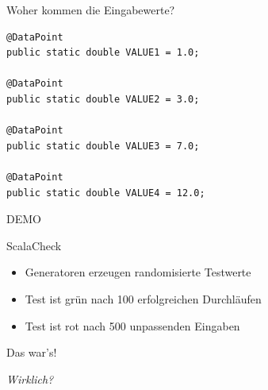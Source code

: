 \begin{frame}[fragile]{Woher kommen die Eingabewerte?}
\begin{lstlisting}
@DataPoint
public static double VALUE1 = 1.0;

@DataPoint
public static double VALUE2 = 3.0;

@DataPoint
public static double VALUE3 = 7.0;

@DataPoint
public static double VALUE4 = 12.0;
\end{lstlisting}
\end{frame}

\begin{frame}{}
\begin{center}
DEMO
\end{center}
\end{frame}

\begin{frame}[fragile]{ScalaCheck}
	\begin{itemize}
		\item Generatoren erzeugen randomisierte Testwerte
		\item Test ist grün nach 100 erfolgreichen Durchläufen
		\item Test ist rot nach 500 unpassenden Eingaben
	\end{itemize}
\end{frame}

\begin{frame}
\begin{center}\Huge
Das war's!
\end{center}
\pause
\vspace{.1cm}
\begin{flushright}\Huge
\itshape Wirklich?
\end{flushright}
\end{frame}
